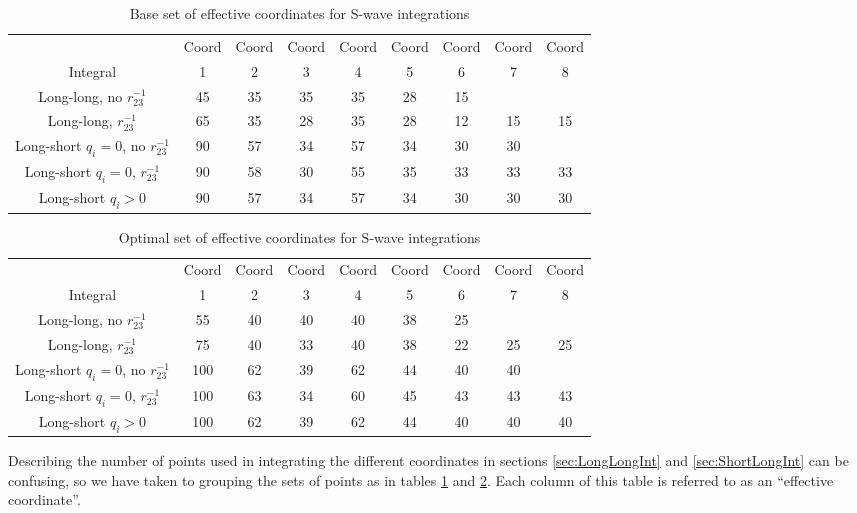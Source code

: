 \documentclass[Dissertation.tex]{subfiles}
\begin{document}
\begin{table}[H]
\begin{center}
\begin{tabular}{|c|c|c|c|c|c|c|c|c|}
\hline
 & Coord & Coord & Coord & Coord & Coord & Coord & Coord & Coord\\
Integral & 1 & 2 & 3 & 4 & 5 & 6 & 7 & 8 \\
\hline
 Long-long, no $r_{23}^{-1}$ & 45 & 35 & 35 & 35 & 28 & 15 & & \\
 Long-long, $r_{23}^{-1}$ & 65 & 35 & 28 & 35 & 28 & 12 & 15 & 15 \\
\hline
 Long-short $q_i = 0$, no $r_{23}^{-1}$ & 90 & 57 & 34 & 57 & 34 & 30 & 30 & \\
 Long-short $q_i = 0$, $r_{23}^{-1}$ & 90 & 58 & 30 & 55 & 35 & 33 & 33 & 33 \\
 Long-short $q_i > 0$ & 90 & 57 & 34 & 57 & 34 & 30 & 30 & 30 \\
\hline
\end{tabular}
\caption{Base set of effective coordinates for S-wave integrations}
\label{tab:BaseEffectiveCoords}
\end{center}
\end{table}


\begin{table}[H]
\begin{center}
\begin{tabular}{|c|c|c|c|c|c|c|c|c|}
\hline
 & Coord & Coord & Coord & Coord & Coord & Coord & Coord & Coord\\
Integral & 1 & 2 & 3 & 4 & 5 & 6 & 7 & 8 \\
\hline
 Long-long, no $r_{23}^{-1}$ & 55 & 40 & 40 & 40 & 38 & 25 & & \\
 Long-long, $r_{23}^{-1}$ & 75 & 40 & 33 & 40 & 38 & 22 & 25 & 25 \\
\hline
 Long-short $q_i = 0$, no $r_{23}^{-1}$ & 100 & 62 & 39 & 62 & 44 & 40 & 40 & \\
 Long-short $q_i = 0$, $r_{23}^{-1}$ & 100 & 63 & 34 & 60 & 45 & 43 & 43 & 43 \\
 Long-short $q_i > 0$ & 100 & 62 & 39 & 62 & 44 & 40 & 40 & 40 \\
\hline
\end{tabular}
\caption{Optimal set of effective coordinates for S-wave integrations}
\label{tab:OptimalEffectiveCoords}
\end{center}
\end{table}

Describing the number of points used in integrating the different coordinates in sections \ref{sec:LongLongInt} and \ref{sec:ShortLongInt} can be confusing, so we have taken to grouping the sets of points as in tables \ref{tab:BaseEffectiveCoords} and \ref{tab:OptimalEffectiveCoords}. Each column of this table is referred to as an ``effective coordinate''.
\end{document}

